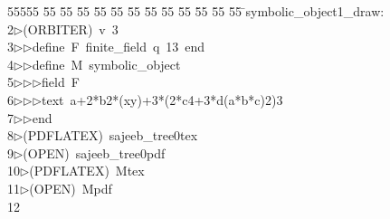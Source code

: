 %
%
\begin{tabbing}
55555 \= 55 \= 55 \= 55 \= 55 \= 55 \= 55 \= 55 \= 55 \= 55 \= 55 \= 55 \= 55 \= \>symbolic\_object1\_draw:\\[0pt]
2\>$\triangleright$\>(ORBITER)\ v\ 3\ \\[0pt]
3\>$\triangleright$\>$\triangleright$\>define\ F\ finite\_field\ q\ 13\ end\ \\[0pt]
4\>$\triangleright$\>$\triangleright$\>define\ M\ symbolic\_object\ \\[0pt]
5\>$\triangleright$\>$\triangleright$\>$\triangleright$\>field\ F\ \\[0pt]
6\>$\triangleright$\>$\triangleright$\>$\triangleright$\>text\ a+2*b2*(xy)+3*(2*c4+3*d(a*b*c)2)3\ \\[0pt]
7\>$\triangleright$\>$\triangleright$\>end\\[0pt]
8\>$\triangleright$\>(PDFLATEX)\ sajeeb\_tree0tex\\[0pt]
9\>$\triangleright$\>(OPEN)\ sajeeb\_tree0pdf\\[0pt]
10\>$\triangleright$\>(PDFLATEX)\ Mtex\\[0pt]
11\>$\triangleright$\>(OPEN)\ Mpdf\\[0pt]
12\>\end{tabbing}
